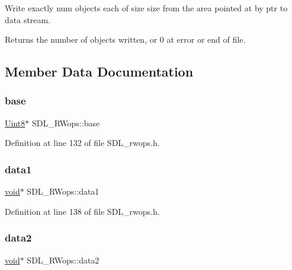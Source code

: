 Write exactly {\ttfamily num} objects each of size {\ttfamily size} from the area pointed at by {\ttfamily ptr} to data stream.

\begin{DoxyReturn}{Returns}
the number of objects written, or 0 at error or end of file. 
\end{DoxyReturn}


\subsection{Member Data Documentation}
\mbox{\label{struct_s_d_l___r_wops_af9b489d7342296ce197b911cfa93b2ab}} 
\subsubsection{\texorpdfstring{base}{base}}
{\footnotesize\ttfamily \mbox{\hyperlink{_s_d_l__stdinc_8h_a2944638813a090aa23e62f4da842c3e2}{Uint8}}$\ast$ S\+D\+L\+\_\+\+R\+Wops\+::base}



Definition at line 132 of file S\+D\+L\+\_\+rwops.\+h.

\mbox{\label{struct_s_d_l___r_wops_ab89d27b4312c0b9d664c81bc92917fc8}} 
\subsubsection{\texorpdfstring{data1}{data1}}
{\footnotesize\ttfamily \mbox{\hyperlink{_s_d_l__opengles2__gl2ext_8h_ae5d8fa23ad07c48bb609509eae494c95}{void}}$\ast$ S\+D\+L\+\_\+\+R\+Wops\+::data1}



Definition at line 138 of file S\+D\+L\+\_\+rwops.\+h.

\mbox{\label{struct_s_d_l___r_wops_aca073130e2e262eb11e86e1be993e215}} 
\subsubsection{\texorpdfstring{data2}{data2}}
{\footnotesize\ttfamily \mbox{\hyperlink{_s_d_l__opengles2__gl2ext_8h_ae5d8fa23ad07c48bb609509eae494c95}{void}}$\ast$ S\+D\+L\+\_\+\+R\+Wops\+::data2}




